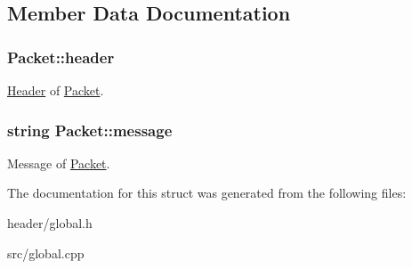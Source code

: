\subsection{Member Data Documentation}
\hypertarget{structPacket_ae19cf919ad4dc07d036f47de65521d12}{
\subsubsection[{header}]{ Packet\-::header}}\label{structPacket_ae19cf919ad4dc07d036f47de65521d12}
\hyperlink{structHeader}{Header} of \hyperlink{structPacket}{Packet}. \hypertarget{structPacket_a8634c4b3877735f707488d1c7a16454c}{
\subsubsection[{message}]{\setlength{\rightskip}{0pt plus 5cm}string Packet\-::message}}\label{structPacket_a8634c4b3877735f707488d1c7a16454c}
Message of \hyperlink{structPacket}{Packet}. 

The documentation for this struct was generated from the following files\-:\begin{DoxyCompactItemize}
\item 
header/global.\-h\item 
src/global.\-cpp\end{DoxyCompactItemize}

